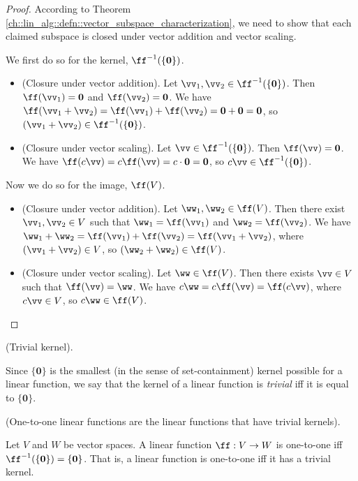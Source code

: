 \begin{proof}
    According to Theorem \ref{ch::lin_alg::defn::vector_subspace_characterization}, we need to show that each claimed subspace is closed under vector addition and vector scaling.

    We first do so for the kernel, $\ff^{-1}(\{\mathbf{0}\})$.
    \begin{itemize}
        \item (Closure under vector addition). Let $\vv_1, \vv_2 \in \ff^{-1}(\{\mathbf{0}\})$. Then $\ff(\vv_1) = \mathbf{0}$ and $\ff(\vv_2) = \mathbf{0}$. We have $\ff(\vv_1 + \vv_2) =\ff(\vv_1) + \ff(\vv_2) = \mathbf{0} + \mathbf{0} = \mathbf{0}$, so $(\vv_1 + \vv_2) \in \ff^{-1}(\{\mathbf{0}\})$.        
        \item (Closure under vector scaling). Let $\vv \in \ff^{-1}(\{\mathbf{0}\})$. Then $\ff(\vv) = \mathbf{0}$. We have $\ff(c\vv) = c\ff(\vv) = c\cdot \mathbf{0} = \mathbf{0}$, so $c\vv \in \ff^{-1}(\{\mathbf{0}\})$.
    \end{itemize}

    Now we do so for the image, $\ff(V)$.
    \begin{itemize}
        \item (Closure under vector addition). Let $\ww_1, \ww_2 \in \ff(V)$. Then there exist $\vv_1, \vv_2 \in V$ such that $\ww_1 = \ff(\vv_1)$ and $\ww_2 = \ff(\vv_2)$. We have $\ww_1 + \ww_2 = \ff(\vv_1) + \ff(\vv_2) = \ff(\vv_1 + \vv_2)$, where $(\vv_1 + \vv_2) \in V$, so $(\ww_2 + \ww_2) \in \ff(V)$.
        \item (Closure under vector scaling). Let $\ww \in \ff(V)$. Then there exists $\vv \in V$ such that $\ff(\vv) = \ww$. We have $c\ww = c\ff(\vv) = \ff(c\vv)$, where $c\vv \in V$, so $c\ww \in \ff(V)$.
    \end{itemize}
\end{proof}

\begin{defn}
    (Trivial kernel).
    
    Since $\{\mathbf{0}\}$ is the smallest (in the sense of set-containment) kernel possible for a linear function, we say that the kernel of a linear function is \textit{trivial} iff it is equal to $\{\mathbf{0}\}$.
\end{defn}

\begin{theorem}
\label{ch::lin_alg::thm::linear_fn_1-1_trivial_kernel}
    (One-to-one linear functions are the linear functions that have trivial kernels). 
    
    Let $V$ and $W$ be vector spaces. A linear function $\ff:V \rightarrow W$ is one-to-one iff $\ff^{-1}(\{\mathbf{0}\}) = \{\mathbf{0}\}$. That is, a linear function is one-to-one iff it has a trivial kernel.
\end{theorem}

